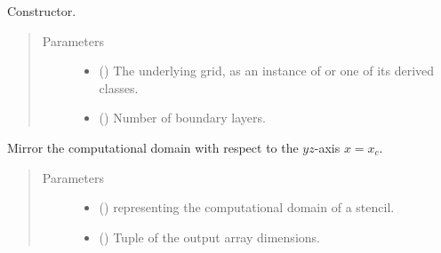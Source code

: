 \documentclass[letterpaper,10pt,english]{sphinxmanual}
\begin{document}
\begin{fulllineitems}
\begin{fulllineitems}
\label{\detokenize{api:tasmania.dycore.horizontal_boundary_relaxed.RelaxedSymmetricYZ.__init__}}
Constructor.
\begin{quote}\begin{description}
\item[{Parameters}] \leavevmode\begin{itemize}
\item {} 
 () \textendash{} The underlying grid, as an instance of {\hyperref[\detokenize{api:tasmania.grids.grid_xyz.GridXYZ}]{}} or one of its derived classes.

\item {} 
 () \textendash{} Number of boundary layers.

\end{itemize}

\end{description}\end{quote}

\end{fulllineitems}


\begin{fulllineitems}
\label{\detokenize{api:tasmania.dycore.horizontal_boundary_relaxed.RelaxedSymmetricYZ.from_computational_to_physical_domain}}
Mirror the computational domain with respect to the \(yz\)-axis \(x = x_c\).
\begin{quote}\begin{description}
\item[{Parameters}] \leavevmode\begin{itemize}
\item {} 
 () \textendash{}  representing the computational domain of a stencil.

\item {} 
 () \textendash{} Tuple of the output array dimensions.


\end{itemize}
\end{description}
\end{quote}
\end{fulllineitems}
\end{fulllineitems}
\end{document}
